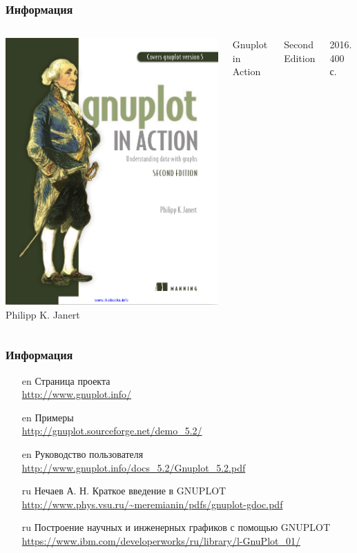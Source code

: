 \documentclass[12pt, compress]{beamer}
\renewcommand{\emph}[1]{\textcolor{dark-blue}{#1}}
\begin{document}
\begin{frame}[t]
\frametitle{Информация}
\begin{columns}
\includegraphics[width=1.0\textwidth]{book.png}\\
Philipp K. Janert 

\emph{Gnuplot in Action}

Second Edition

2016. 400 с.
\end{columns}  
\end{frame}


\begin{frame}[t]
\frametitle{Информация}
\begin{itemize}
  \item[en] Страница проекта \\
  {\scriptsize \url{http://www.gnuplot.info/} }
  \item[en] Примеры \\
  {\scriptsize \url{http://gnuplot.sourceforge.net/demo_5.2/} }
  \item[en] Руководство пользователя \\
  {\scriptsize  \url{http://www.gnuplot.info/docs_5.2/Gnuplot_5.2.pdf} }
  \item[ru] Нечаев А. Н. Краткое введение в GNUPLOT \\
  {\scriptsize  \url{http://www.phys.vsu.ru/~meremianin/pdfs/gnuplot-gdoc.pdf} }
  \item[ru] Построение научных и инженерных графиков с помощью GNUPLOT \\
  {\scriptsize  \url{https://www.ibm.com/developerworks/ru/library/l-GnuPlot_01/} }  
\end{itemize}
\end{frame}
\end{document}
